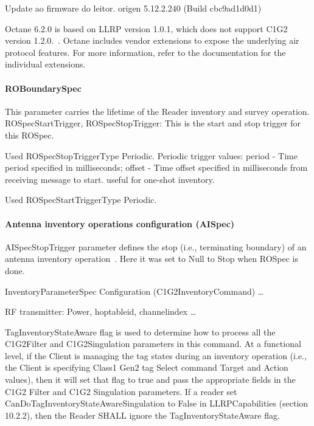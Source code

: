 Update ao firmware do leitor. origen 5.12.2.240 (Build cbc9ad1d0d1)


Octane 6.2.0 is based on LLRP version 1.0.1, which does not support C1G2 version 1.2.0.~\cite[sec. 3.1.21]{ImpinjOctaneLLRP}. Octane includes vendor extensions to expose the underlying air protocol features. For more information, refer to the documentation for the individual extensions.

\paragraph{ROBoundarySpec}

This parameter carries the lifetime of the Reader inventory and survey operation.
ROSpecStartTrigger, ROSpecStopTrigger: This is the start and stop trigger for this ROSpec.

Used ROSpecStopTriggerType Periodic.
Periodic trigger values: period - Time period specified in milliseconds; offset - Time offset specified in milliseconds from receiving message to start. useful for one-shot inventory.

Used ROSpecStartTriggerType Periodic.

\paragraph{Antenna inventory operations configuration (AISpec)}

AISpecStopTrigger parameter defines the stop (i.e., terminating boundary) of an antenna inventory operation~\cite[sec. 11.2.2.1]{Llrp1standard20101013Pdf}. Here it was set to Null to Stop when ROSpec is done.

InventoryParameterSpec Configuration (C1G2InventoryCommand) \dots

RF transmitter: Power, hoptableid, channelindex \dots

TagInventoryStateAware flag is used to determine how to process all the C1G2Filter and C1G2Singulation parameters in this command. At a functional level, if the Client is managing the tag states during an inventory operation (i.e., the Client is specifying Class1 Gen2 tag Select command Target and Action values), then it will set that flag to true and pass the appropriate fields in the C1G2 Filter and C1G2 Singulation parameters. If a reader set CanDoTagInventoryStateAwareSingulation to False in LLRPCapabilities (section 10.2.2), then the Reader SHALL ignore the TagInventoryStateAware flag.

